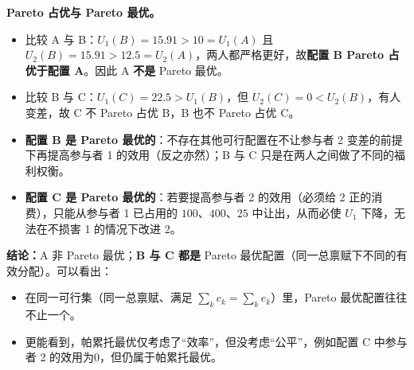 \begin{tcolorbox}[example,title=例题：帕累托最优]
\begin{solution}
        \textbf{Pareto 占优与 Pareto 最优。}
        \begin{itemize}
            \item 比较 A 与 B：$U_1(B)=15.91>10=U_1(A)$ 且 $U_2(B)=15.91>12.5=U_2(A)$，两人都严格更好，故\textbf{配置 B Pareto 占优于配置 A}。因此 A \textbf{不是} Pareto 最优。

            \item 比较 B 与 C：$U_1(C)=22.5>U_1(B)$，但 $U_2(C)=0<U_2(B)$，有人变差，故 C 不 Pareto 占优 B，B 也不 Pareto 占优 C。

            \item \textbf{配置 B 是 Pareto 最优的}：不存在其他可行配置在不让参与者 2 变差的前提下再提高参与者 1 的效用（反之亦然）；B 与 C 只是在两人之间做了不同的福利权衡。

            \item \textbf{配置 C 是 Pareto 最优的}：若要提高参与者 2 的效用（必须给 2 正的消费），只能从参与者 1 已占用的 $100$、$400$、$25$ 中让出，从而必使 $U_1$ 下降，无法在不损害 1 的情况下改进 2。
        \end{itemize}

        
    \end{solution}

    \begin{tcolorbox}[warning,title=注意]
        \textbf{结论：}A 非 Pareto 最优；\textbf{B 与 C 都是} Pareto 最优配置（同一总禀赋下不同的有效分配）。可以看出：
        \begin{itemize}
            \item 在同一可行集（同一总禀赋、满足 $\sum_k c_k=\sum_k e_k$）里，Pareto 最优配置往往不止一个。
            \item 更能看到，帕累托最优仅考虑了“效率”，但没考虑“公平”，例如配置 C 中参与者 2 的效用为0，但仍属于帕累托最优。
        \end{itemize}
        \end{tcolorbox}
\end{tcolorbox}


